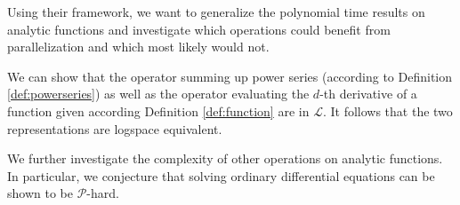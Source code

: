 \documentclass{article}
\newcommand{\p}{\ensuremath{\mathcal P}\xspace}
\newcommand{\cl}{\ensuremath{\mathcal{L}}\xspace}
\begin{document}
Using their framework, we want to generalize the polynomial time results on analytic functions and investigate which operations could benefit from parallelization and which most likely would not.

We can show that the operator summing up power series (according to Definition \ref{def:powerseries}) as well as the operator evaluating the $d$-th derivative of a function given according Definition \ref{def:function} are in \cl.
It follows that the two representations are logspace equivalent.

We further investigate the complexity of other operations on analytic functions.
In particular, we conjecture that solving ordinary differential equations can be shown to be \p-hard.


{}
\end{document}

